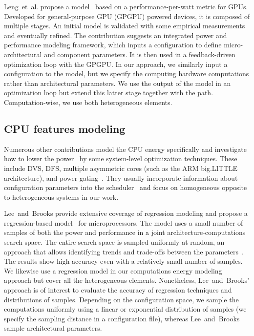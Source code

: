 Leng~et~al. propose a model~\citep{leng2013gpuwattch} based on a performance-per-watt metric for GPUs. Developed for general-purpose GPU (GPGPU) powered devices, it is composed of multiple stages. An initial model is validated with some empirical measurements and eventually refined.  The contribution suggests an integrated power and performance modeling framework, which inputs a configuration to define micro-architectural and component parameters. It is then used in a feedback-driven optimization loop with the GPGPU. In our approach, we similarly input a configuration to the model, but we specify the computing hardware computations rather than architectural parameters. We use the output of the model in an optimization loop but extend this latter stage together with the path. Computation-wise, we use both heterogeneous elements.

\subsection{CPU features modeling}
\label{sec:soa-cpu}

Numerous other contributions model the CPU energy specifically and investigate how to lower the power~\citep{hong1999power, luo2001battery, chowdhury2005static} by some system-level optimization techniques. These include DVS, DFS, multiple asymmetric cores (such as the ARM big.LITTLE architecture), and power gating~\citep{walker2017accurate}. They usually incorporate information about configuration parameters into the scheduler~\citep{seewald2019coarse} and focus on homogeneous opposite to heterogeneous systems in our work. 

Lee~and~Brooks provide extensive coverage of regression modeling and propose a regression-based model~\citep{lee2006statistically,lee2006accurate} for microprocessors. The model uses a small number of samples of both the power and performance in a joint architecture-computations search space. The entire search space is sampled uniformly at random, an approach that allows identifying trends and trade-offs between the parameters~\citep{lee2006accurate}. The results show high accuracy even with a relatively small number of samples. We likewise use a regression model in our computations energy modeling approach but cover all the heterogeneous elements. Nonetheless, Lee~and~Brooks' approach is of interest to evaluate the accuracy of regression techniques and distributions of samples. Depending on the configuration space, we sample the computations uniformly using a linear or exponential distribution of samples (we specify the sampling distance in a configuration file), whereas Lee~and~Brooks sample architectural parameters.

